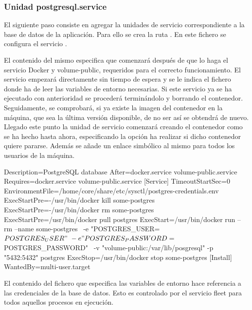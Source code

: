 \subsubsection{Unidad postgresql.service}

El siguiente paso consiste en agregar la unidades de servicio correspondiente a la base de datos de la aplicación. Para ello  se crea la ruta . En este fichero se configura el servicio .

El contenido del mismo especifica que comenzará después de que lo haga el servicio Docker y volume-public, requeridos para el correcto funcionamiento. El servicio empezará directamente sin tiempo de espera y se le indica el fichero donde ha de leer las variables de entorno necesarias. Si este servicio ya se ha ejecutado con anterioridad se procederá terminándolo y borrando el contenedor. Seguidamente, se comprobará, si ya existe la imagen del contenedor en la máquina, que sea la última versión disponible, de no ser así se obtendrá de nuevo. Llegado este punto la unidad de servicio comenzará creando el contenedor como se ha hecho hasta ahora, especificando la opción ha realizar si dicho contenedor quiere pararse. Además se añade un enlace simbólico al mismo para todos los usuarios de la máquina. 

\begin{codelisting}
\label{code:postgresql.service}
\begin{code}
[Unit] 
  Description=PostgreSQL database 
  After=docker.service volume-public.service
  Requires=docker.service volume-public.service
[Service] 
  TimeoutStartSec=0
  EnvironmentFile=/home/core/share/etc/sysctl/postgres-credentials.env
  ExecStartPre=-/usr/bin/docker kill some-postgres 
  ExecStartPre=-/usr/bin/docker rm some-postgres 
  ExecStartPre=/usr/bin/docker pull postgres 
  ExecStart=/usr/bin/docker run --rm --name some-postgres \
  -e "POSTGRES_USER=${POSTGRES_USER}" \
  -e "POSTGRES_PASSWORD=${POSTGRES_PASSWORD}" \
  -v "volume-public:/var/lib/posgresql" -p "5432:5432" postgres 
  ExecStop=/usr/bin/docker stop some-postgres 
[Install] 
  WantedBy=multi-user.target
\end{code}
\end{codelisting}

El contenido del fichero que especifica las variables de entorno hace referencia a las credenciales de la base de datos. Esto es controlado por el servicio fleet para todos aquellos procesos en ejecución.

